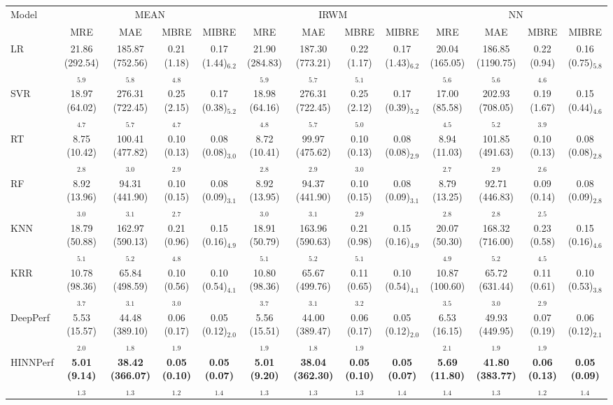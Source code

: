 \begin{tabular}{lcccccccccccc}
\toprule
Model & \multicolumn{4}{c}{MEAN} & \multicolumn{4}{c}{IRWM} & \multicolumn{4}{c}{NN} \\
& MRE & MAE & MBRE & MIBRE & MRE & MAE & MBRE & MIBRE & MRE & MAE & MBRE & MIBRE \\
\midrule
LR & 21.86 (292.54)$_{5.9}$ & 185.87 (752.56)$_{5.8}$ & 0.21 (1.18)$_{4.8}$ & 0.17 (1.44)$_{6.2}$ & 21.90 (284.83)$_{5.9}$ & 187.30 (773.21)$_{5.7}$ & 0.22 (1.17)$_{5.1}$ & 0.17 (1.43)$_{6.2}$ & 20.04 (165.05)$_{5.6}$ & 186.85 (1190.75)$_{5.6}$ & 0.22 (0.94)$_{4.6}$ & 0.16 (0.75)$_{5.8}$ \\
SVR & 18.97 (64.02)$_{4.7}$ & 276.31 (722.45)$_{5.7}$ & 0.25 (2.15)$_{4.7}$ & 0.17 (0.38)$_{5.2}$ & 18.98 (64.16)$_{4.8}$ & 276.31 (722.45)$_{5.7}$ & 0.25 (2.12)$_{5.0}$ & 0.17 (0.39)$_{5.2}$ & 17.00 (85.58)$_{4.5}$ & 202.93 (708.05)$_{5.2}$ & 0.19 (1.67)$_{3.9}$ & 0.15 (0.44)$_{4.6}$ \\
RT & 8.75 (10.42)$_{2.8}$ & 100.41 (477.82)$_{3.0}$ & 0.10 (0.13)$_{2.9}$ & 0.08 (0.08)$_{3.0}$ & 8.72 (10.41)$_{2.8}$ & 99.97 (475.62)$_{2.9}$ & 0.10 (0.13)$_{3.0}$ & 0.08 (0.08)$_{2.9}$ & 8.94 (11.03)$_{2.7}$ & 101.85 (491.63)$_{2.9}$ & 0.10 (0.13)$_{2.6}$ & 0.08 (0.08)$_{2.8}$ \\
RF & 8.92 (13.96)$_{3.0}$ & 94.31 (441.90)$_{3.1}$ & 0.10 (0.15)$_{2.7}$ & 0.08 (0.09)$_{3.1}$ & 8.92 (13.95)$_{3.0}$ & 94.37 (441.90)$_{3.1}$ & 0.10 (0.15)$_{2.9}$ & 0.08 (0.09)$_{3.1}$ & 8.79 (13.25)$_{2.8}$ & 92.71 (446.83)$_{2.8}$ & 0.09 (0.14)$_{2.5}$ & 0.08 (0.09)$_{2.8}$ \\
KNN & 18.79 (50.88)$_{5.1}$ & 162.97 (590.13)$_{5.2}$ & 0.21 (0.96)$_{4.8}$ & 0.15 (0.16)$_{4.9}$ & 18.91 (50.79)$_{5.1}$ & 163.96 (590.63)$_{5.2}$ & 0.21 (0.98)$_{5.1}$ & 0.15 (0.16)$_{4.9}$ & 20.07 (50.30)$_{4.9}$ & 168.32 (716.00)$_{5.2}$ & 0.23 (0.58)$_{4.5}$ & 0.15 (0.16)$_{4.6}$ \\
KRR & 10.78 (98.36)$_{3.7}$ & 65.84 (498.59)$_{3.1}$ & 0.10 (0.56)$_{3.0}$ & 0.10 (0.54)$_{4.1}$ & 10.80 (98.36)$_{3.7}$ & 65.67 (499.76)$_{3.1}$ & 0.11 (0.65)$_{3.2}$ & 0.10 (0.54)$_{4.1}$ & 10.87 (100.60)$_{3.5}$ & 65.72 (631.44)$_{3.0}$ & 0.11 (0.61)$_{2.9}$ & 0.10 (0.53)$_{3.8}$ \\
DeepPerf & 5.53 (15.57)$_{2.0}$ & 44.48 (389.10)$_{1.8}$ & 0.06 (0.17)$_{1.9}$ & 0.05 (0.12)$_{2.0}$ & 5.56 (15.51)$_{1.9}$ & 44.00 (389.47)$_{1.8}$ & 0.06 (0.17)$_{1.9}$ & 0.05 (0.12)$_{2.0}$ & 6.53 (16.15)$_{2.1}$ & 49.93 (449.95)$_{1.9}$ & 0.07 (0.19)$_{1.9}$ & 0.06 (0.12)$_{2.1}$ \\
HINNPerf & \textbf{5.01 (9.14)$_{1.3}$} & \textbf{38.42 (366.07)$_{1.3}$} & \textbf{0.05 (0.10)$_{1.2}$} & \textbf{0.05 (0.07)$_{1.4}$} & \textbf{5.01 (9.20)$_{1.3}$} & \textbf{38.04 (362.30)$_{1.3}$} & \textbf{0.05 (0.10)$_{1.3}$} & \textbf{0.05 (0.07)$_{1.4}$} & \textbf{5.69 (11.80)$_{1.4}$} & \textbf{41.80 (383.77)$_{1.3}$} & \textbf{0.06 (0.13)$_{1.2}$} & \textbf{0.05 (0.09)$_{1.4}$} \\
\bottomrule
\end{tabular}
